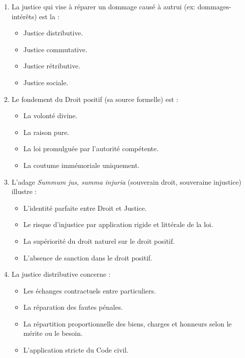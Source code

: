 \documentclass[11pt]{article}
\begin{document}
\begin{exercice}
\begin{enumerate}
    \item La justice qui vise à réparer un dommage causé à autrui (ex: dommages-intérêts) est la :
    \begin{itemize}
        \item [$\square$] Justice distributive.
        \item [$\square$] Justice commutative.
        \item [$\square$] Justice rétributive.
        \item [$\square$] Justice sociale.
    \end{itemize}
    \item Le fondement du Droit positif (sa source formelle) est :
    \begin{itemize}
        \item [$\square$] La volonté divine.
        \item [$\square$] La raison pure.
        \item [$\square$] La loi promulguée par l'autorité compétente.
        \item [$\square$] La coutume immémoriale uniquement.
    \end{itemize}
    \item L'adage \og \textit{Summum jus, summa injuria} \fg{} (souverain droit, souveraine injustice) illustre :
    \begin{itemize}
        \item [$\square$] L'identité parfaite entre Droit et Justice.
        \item [$\square$] Le risque d'injustice par application rigide et littérale de la loi.
        \item [$\square$] La supériorité du droit naturel sur le droit positif.
        \item [$\square$] L'absence de sanction dans le droit positif.
    \end{itemize}
    \item La justice distributive concerne :
    \begin{itemize}
        \item [$\square$] Les échanges contractuels entre particuliers.
        \item [$\square$] La réparation des fautes pénales.
        \item [$\square$] La répartition proportionnelle des biens, charges et honneurs selon le mérite ou le besoin.
        \item [$\square$] L'application stricte du Code civil.
    \end{itemize}
\end{enumerate}
\end{exercice}
\end{document}
